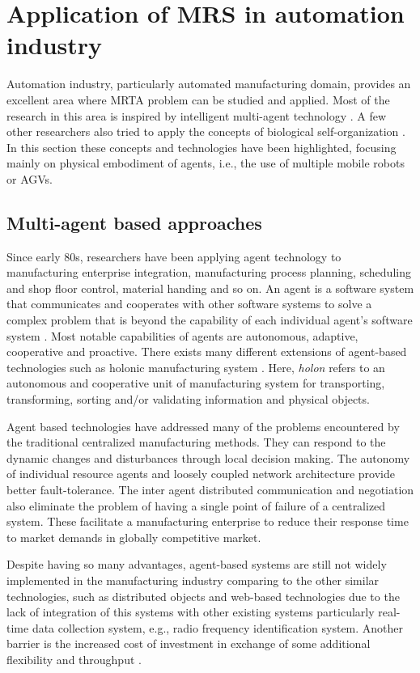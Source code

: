 \section{Application of MRS in automation industry}
\label{bg:mrs-industry}
Automation industry, particularly automated manufacturing domain, provides an excellent area where MRTA problem can be studied and applied. Most of the research in this area is inspired by intelligent multi-agent technology \cite{Shen+2006}. A few other researchers also tried to apply the concepts of biological self-organization \cite{Ueda2006,Lazinica+2007}. In this section  these concepts and technologies have been highlighted, focusing mainly on physical embodiment of agents, i.e., the use of multiple mobile robots or  AGVs. 
\subsection{Multi-agent based approaches}
Since early 80s, researchers have been applying agent technology to manufacturing enterprise integration, manufacturing process planning, scheduling and shop floor control, material handing and so on. An agent is a software system that communicates and cooperates with other software systems to solve a complex problem that is beyond the capability of each individual agent's software system \cite{Shen+2001}. Most notable capabilities of agents are autonomous, adaptive, cooperative and proactive. There exists many different extensions of agent-based technologies such as holonic manufacturing system \cite{Bussmann+2004}. Here, {\em holon} refers to an autonomous and cooperative unit of manufacturing system for transporting, transforming, sorting and/or validating information and physical objects.

Agent based technologies have addressed many of the problems encountered by the traditional centralized manufacturing methods. They can respond to the dynamic changes and disturbances through local decision making. The autonomy of individual resource agents and loosely coupled network architecture provide better fault-tolerance. The inter agent distributed communication and negotiation also eliminate the problem of having a single point of failure of a centralized system. These facilitate a manufacturing enterprise to reduce their response time to market demands in globally competitive market. 

Despite having so many advantages, agent-based systems are still not widely implemented in the manufacturing industry comparing to the other similar technologies, such as distributed objects and web-based technologies due to the lack of integration of this systems with other existing systems particularly real-time data collection system, e.g., radio frequency identification system. Another barrier is the increased cost of investment in exchange of some additional flexibility and throughput \cite{Schild+2007}.
